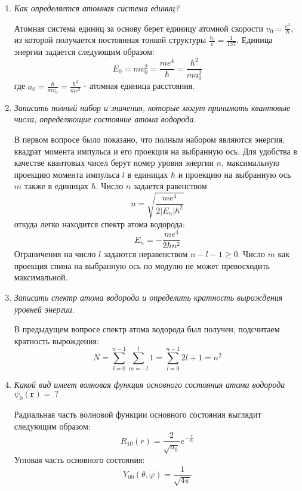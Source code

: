 \documentclass{article}
\begin{document}
\begin{enumerate}
		 \item \textit{Как определяется атомная система единиц?}
		 
		 Атомная система единиц за основу берет единицу атомной скорости $v_0 = \frac{e^2}{\hbar}$, из которой получается постоянная тонкой структуры $\frac{v_0}{c} = \frac{1}{137}$. Единица энергии задается следующим образом:
		 \begin{equation}
		 	E_0 = mv_0^2 = \frac{me^4}{\hbar} = \frac{\hbar^2}{ma_0^2}
		 \end{equation}
		 где $a_0 = \frac{\hbar}{mv_0} = \frac{\hbar^2}{me^2}$ - атомная единица расстояния.
		 
		 \item \textit{Записать полный набор и значения, которые могут принимать квантовые числа, определяющие состояние атома водорода.}
		 
		 В первом вопросе было показано, что полным набором являются энергия, квадрат момента импульса и его проекция на выбранную ось. Для удобства в качестве квантовых чисел берут номер уровня энергии $n$, максимальную проекцию момента импульса $l$ в единицах $\hbar$ и проекцию на выбранную ось $m$ также в единицах $\hbar$. Число $n$ задается равенством
		 \begin{equation}
		 	n = \sqrt{\frac{me^4}{2|E_n|\hbar^2}}
		 \end{equation}
		 откуда легко находится спектр атома водорода:
		 \begin{equation}
		 	E_n = -\frac{me^4}{2\hbar n^2}
		 \end{equation}
		 Ограничения на число $l$ задаются неравенством $n - l - 1 \geq 0$. Число $m$ как проекция спина на выбранную ось по модулю не может превосходить максимальной.
		 \item \textit{Записать спектр атома водорода и определить кратность вырождения уровней энергии.}
		 
		 В предыдущем вопросе спектр атома водорода был получен, подсчитаем кратность вырождения:
		 \begin{equation}
		 	N = \sum\limits_{l=0}^{n-1}\sum\limits_{m=-l}^{l}1 = \sum\limits_{l=0}^{n-1} 2l+1 = n^2
		 \end{equation}
		 
		 \item \textit{Какой вид имеет волновая функция основного состояния атома водорода $\psi_0(\textbf{r}) = \ ?$}
		 
		 Радиальная часть волновой функции основного состояния выглядит следующим образом:
		 \begin{equation}
		 	R_{10}(r) = \frac{2}{\sqrt{a_0}}e^{-\frac{r}{a_0}}
		 \end{equation}
		 Угловая часть основного состояния:
		 \begin{equation}
		 	Y_{00}(\theta, \varphi) = \frac{1}{\sqrt{4\pi}}
		 \end{equation}
	\end{enumerate}
\end{document}
